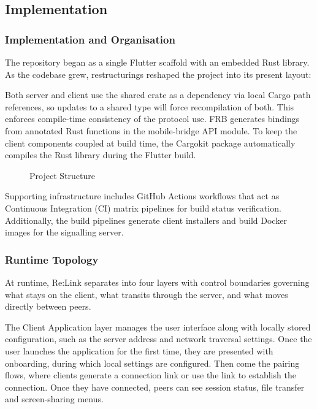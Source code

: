 \documentclass[12pt,a4paper]{article}
\begin{document}
\subsection{Implementation}

\subsubsection{Implementation and Organisation}

The repository began as a single Flutter scaffold with an embedded Rust library. As the codebase grew, restructurings reshaped the project into its present layout:

Both server and client use the shared crate as a dependency via local Cargo path references, so updates to a shared type will force recompilation of both. This enforces compile-time consistency of the protocol use. FRB generates bindings from annotated Rust functions in the mobile-bridge API module. To keep the client components coupled at build time, the Cargokit package automatically compiles the Rust library during the Flutter build.

\begin{figure}[htbp]
\centering
{}
\caption{Project Structure}
\end{figure}

Supporting infrastructure includes GitHub Actions workflows that act as Continuous Integration (CI) matrix pipelines for build status verification. Additionally, the build pipelines generate client installers and build Docker images for the signalling server.

\subsubsection{Runtime Topology}

At runtime, Re:Link separates into four layers with control boundaries governing what stays on the client, what transits through the server, and what moves directly between peers.

The Client Application layer manages the user interface along with locally stored configuration, such as the server address and network traversal settings. Once the user launches the application for the first time, they are presented with onboarding, during which local settings are configured. Then come the pairing flows, where clients generate a connection link or use the link to establish the connection. Once they have connected, peers can see session status, file transfer and screen-sharing menus.
\end{document}
